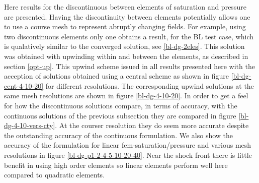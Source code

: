 Here results for the discontinuous between elements 
of saturation and pressure are presented. 
Having the discontinuity between elements potentially allows one 
to use a course mesh to represent abruptly changing fields. 
For example, using two discontinuous elements only one 
obtains a result, for the BL test case, which is qualatively 
similar to the converged solution, see \ref{bl-dg-2eles}. 
This solution was obtained with upwinding within and 
between the elements, as described in section \ref{opt-up}. 
This upwind scheme issued in all results presented here 
with the acception of solutions obtained using a central scheme 
as shown in figure \ref{bl-dg-cent-4-10-20} for different 
resolutions. The corresponding upwind solutions at the 
same mesh resolutions are shown in figure \ref{bl-dg-4-10-20}. 
In order to get a feel for how the discontinuous solutions 
compare, in terms of accuracy, with the continuous 
solutions of the previous subsection they are compared 
in figure \ref{bl-dg-4-10-vers-cty}. At the courser resolution 
they do seem more accurate despite the outstanding accuracy 
of the continuous formulation. We also show 
the accuracy of the formulation for linear fem-saturation/pressure and various mesh resolutions in figure \ref{bl-dg-p1-2-4-5-10-20-40}. 
Near the shock front there is little benefit in using high order elements 
so linear elements perform well here compared to quadratic elements. 








